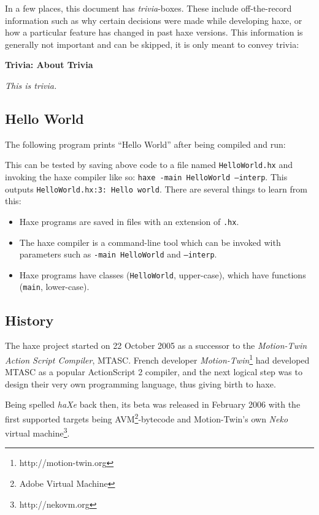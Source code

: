 \documentclass{article}
\newcommand{\type}[1]{\texttt{#1}}
\newcommand{\expr}[1]{\texttt{#1}}
\newenvironment{myshaded}
  {\def\FrameCommand{\fboxsep=\topsep\colorbox{bgcolor}}%
  \MakeFramed {\advance\hsize-\width \FrameRestore}}%
 {\endMakeFramed}
\newcommand{\trivia}[2]
	{\begin{myshaded}\noindent\textbf{Trivia: #1}\par\nobreak\noindent\ignorespaces\textit{#2}\end{myshaded}}
\newcommand{\ic}[1]{\texttt{#1}}
\newcommand{\haxe}[2][]{%
}
\begin{document}
In a few places, this document has \emph{trivia}-boxes. These include off-the-record information such as why certain decisions were made while developing haxe, or how a particular feature has changed in past haxe versions. This information is generally not important and can be skipped, it is only meant to convey trivia:

\trivia{About Trivia}{This is trivia.}


\subsection{Hello World}
\label{Hello World}

The following program prints ``Hello World'' after being compiled and run:

\haxe{assets/HelloWorld.hx}
This can be tested by saving above code to a file named \ic{HelloWorld.hx} and invoking the haxe compiler like so: \ic{haxe -main HelloWorld --interp}. This outputs \ic{HelloWorld.hx:3: Hello world}. There are several things to learn from this:

\begin{itemize}
	\item Haxe programs are saved in files with an extension of \ic{.hx}.
	\item The haxe compiler is a command-line tool which can be invoked with parameters such as \ic{-main HelloWorld} and \ic{--interp}.
	\item Haxe programs have classes (\type{HelloWorld}, upper-case), which have functions (\expr{main}, lower-case). 
\end{itemize}

\subsection{History}

The haxe project started on 22 October 2005 as a successor to the \emph{Motion-Twin Action Script Compiler}, MTASC. French developer \emph{Motion-Twin}\footnote{http://motion-twin.org} had developed MTASC as a popular ActionScript 2 compiler, and the next logical step was to design their very own programming language, thus giving birth to haxe.

Being spelled \emph{haXe} back then, its beta was released in February 2006 with the first supported targets being AVM\footnote{Adobe Virtual Machine}-bytecode and Motion-Twin's own \emph{Neko} virtual machine\footnote{http://nekovm.org}.
\end{document}
